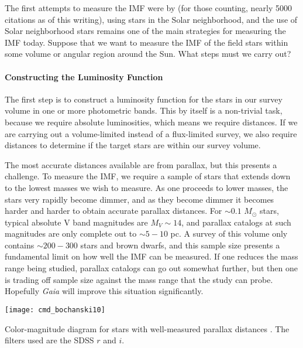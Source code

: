 The first attempts to measure the IMF were by \citet{salpeter55a} (for those counting, nearly 5000 citations as of this writing), using stars in the Solar neighborhood, and the use of Solar neighborhood stars remains one of the main strategies for measuring the IMF today. Suppose that we want to measure the IMF of the field stars within some volume or angular region around the Sun. What steps must we carry out? 

\paragraph{Constructing the Luminosity Function}

The first step is to construct a luminosity function for the stars in our survey volume in one or more photometric bands. This by itself is a non-trivial task, because we require absolute luminosities, which means we require distances. If we are carrying out a volume-limited instead of a flux-limited survey, we also require distances to determine if the target stars are within our survey volume.

The most accurate distances available are from parallax, but this presents a challenge. To measure the IMF, we require a sample of stars that extends down to the lowest masses we wish to measure. As one proceeds to lower masses, the stars very rapidly become dimmer, and as they become dimmer it becomes harder and harder to obtain accurate parallax distances. For $\sim 0.1$ $M_\odot$ stars, typical absolute V band magnitudes are $M_V \sim 14$, and parallax catalogs at such magnitudes are only complete out to $\sim 5-10$ pc. A survey of this volume only contains $\sim 200-300$ stars and brown dwarfs, and this sample size presents a fundamental limit on how well the IMF can be measured. If one reduces the mass range being studied, parallax catalogs can go out somewhat further, but then one is trading off sample size against the mass range that the study can probe. Hopefully \textit{Gaia} will improve this situation significantly.

\begin{marginfigure}
\texttt{[image: cmd\_bochanski10]}
\caption[Color-magnitude diagram of nearby stars]{
\label{fig:cmd_bochanski10}
Color-magnitude diagram for stars with well-measured parallax distances \citet{bochanski10a}. The filters used are the SDSS $r$ and $i$.
}
\end{marginfigure}


